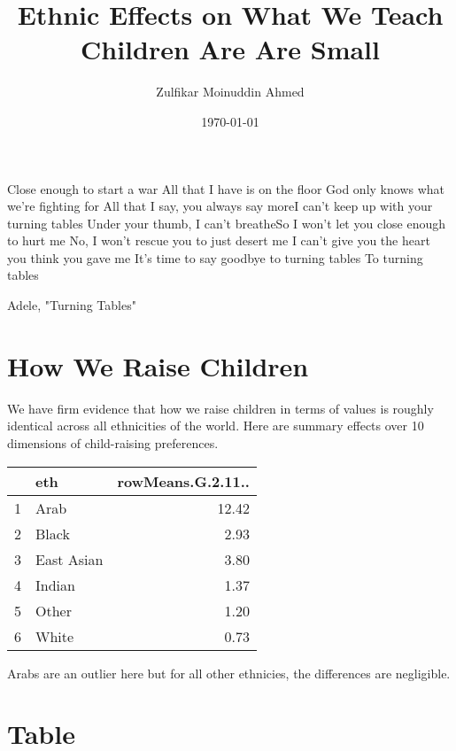 \documentclass{amsart}
\title{Ethnic Effects on What We Teach Children Are Are Small}
\author{Zulfikar Moinuddin Ahmed}
\date{\today}
\begin{document}
\maketitle
\epigraph{Close enough to start a war
All that I have is on the floor
God only knows what we're fighting for
All that I say, you always say moreI can't keep up with your turning tables
Under your thumb, I can't breatheSo I won't let you close enough to hurt me
No, I won't rescue you to just desert me
I can't give you the heart you think you gave me
It's time to say goodbye to turning tables
To turning tables}{Adele, "Turning Tables"}
\section{How We Raise Children}

We have firm evidence that how we raise children in terms of values is roughly identical across all ethnicities of the world.  Here are summary effects over 10 dimensions of child-raising preferences.

\begin{table}[ht]
\centering
\begin{tabular}{rlr}
  \hline
 & eth & rowMeans.G.2.11.. \\ 
  \hline
1 & Arab & 12.42 \\ 
  2 & Black & 2.93 \\ 
  3 & East Asian & 3.80 \\ 
  4 & Indian & 1.37 \\ 
  5 & Other & 1.20 \\ 
  6 & White & 0.73 \\ 
   \hline
\end{tabular}
\end{table}
Arabs are an outlier here but for all other ethnicies, the differences are negligible.

\pagebreak

\section{Table}
\end{document}
